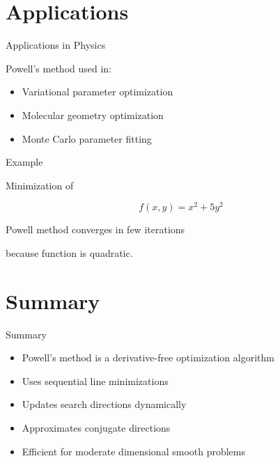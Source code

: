 \documentclass[aspectratio=169]{beamer}
\begin{document}
\section{Applications}

\begin{frame}{Applications in Physics}

Powell's method used in:

\begin{itemize}
\item Variational parameter optimization
\item Molecular geometry optimization
\item Monte Carlo parameter fitting
\end{itemize}
\end{frame}

\begin{frame}{Example}

Minimization of

\[
f(x,y) = x^2 + 5y^2
\]

Powell method converges in few iterations

because function is quadratic.
\end{frame}

\section{Summary}

\begin{frame}{Summary}

\begin{itemize}
\item Powell's method is a derivative-free optimization algorithm
\item Uses sequential line minimizations
\item Updates search directions dynamically
\item Approximates conjugate directions
\item Efficient for moderate dimensional smooth problems
\end{itemize}
\end{frame}
\end{document}
